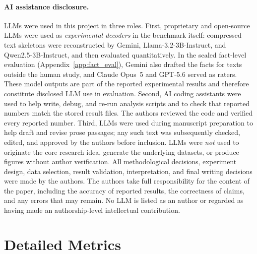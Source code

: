 \documentclass[11pt]{article}
\begin{document}
\paragraph{AI assistance disclosure.}
LLMs were used in this project in three roles. First, proprietary and open-source LLMs were used as
\emph{experimental decoders} in the benchmark itself: compressed text skeletons were reconstructed
by Gemini, Llama-3.2-3B-Instruct, and Qwen2.5-3B-Instruct, and then evaluated quantitatively.
In the scaled fact-level evaluation (Appendix~\ref{app:fact_eval}), Gemini also drafted the facts for
texts outside the human study, and Claude Opus~5 and GPT-5.6 served as raters.
These model outputs are part of the reported experimental results and therefore constitute disclosed
LLM use in evaluation. Second, AI coding assistants were used to help write, debug, and re-run
analysis scripts and to check that reported numbers match the stored result files. The authors
reviewed the code and verified every reported number. Third, LLMs were used during manuscript
preparation to help draft and revise prose passages; any such text was subsequently checked, edited, and
approved by the authors before inclusion. LLMs were \emph{not} used to originate the core research
idea, generate the underlying datasets, or produce figures without author verification. All
methodological decisions, experiment design, data selection, result validation, interpretation, and
final writing decisions were made by the authors. The authors take full responsibility for the
content of the paper, including the accuracy of reported results, the correctness of claims, and
any errors that may remain. No LLM is listed as an author or regarded as having made an
authorship-level intellectual contribution.



\appendix

\section{Detailed Metrics}
\label{app:detailed_metrics}
\end{document}
